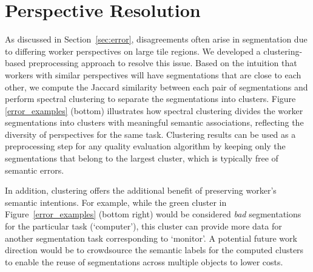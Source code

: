 \vspace{-10pt}
\section{Perspective Resolution\label{perspective}}
As discussed in Section~\ref{sec:error}, disagreements often arise in segmentation due to differing worker perspectives on large tile regions. We developed a clustering-based preprocessing approach to resolve this issue.
Based on the intuition that workers with similar perspectives will have segmentations that are close to each other, we compute the Jaccard similarity between each pair of segmentations and perform spectral clustering to separate the segmentations into clusters. Figure \ref{error_examples} (bottom) illustrates how spectral clustering divides the worker segmentations into clusters with meaningful semantic associations, reflecting the diversity of perspectives for the same task. Clustering results can be used as a preprocessing step for any quality evaluation algorithm by keeping only the segmentations that belong to the largest cluster, which is typically free of semantic errors.
\par In addition, clustering offers the additional benefit of preserving worker's semantic intentions. For example, while the green cluster in Figure~\ref{error_examples} (bottom right) would be considered \textit{bad} segmentations for the particular task (`computer'), this cluster can provide more data for another segmentation task corresponding to `monitor'. A potential future work direction would be to crowdsource the semantic labels for the computed clusters to enable the reuse of segmentations across multiple objects to lower costs.%
